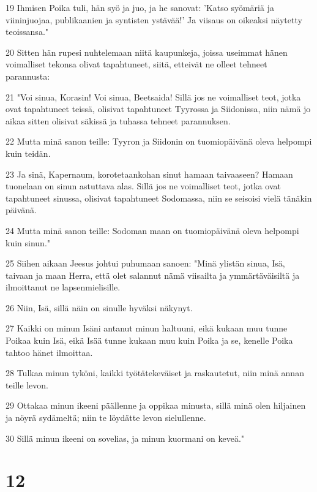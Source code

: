 \par 19 Ihmisen Poika tuli, hän syö ja juo, ja he sanovat: 'Katso syömäriä ja viininjuojaa, publikaanien ja syntisten ystävää!' Ja viisaus on oikeaksi näytetty teoissansa."
\par 20 Sitten hän rupesi nuhtelemaan niitä kaupunkeja, joissa useimmat hänen voimalliset tekonsa olivat tapahtuneet, siitä, etteivät ne olleet tehneet parannusta:
\par 21 "Voi sinua, Korasin! Voi sinua, Beetsaida! Sillä jos ne voimalliset teot, jotka ovat tapahtuneet teissä, olisivat tapahtuneet Tyyrossa ja Siidonissa, niin nämä jo aikaa sitten olisivat säkissä ja tuhassa tehneet parannuksen.
\par 22 Mutta minä sanon teille: Tyyron ja Siidonin on tuomiopäivänä oleva helpompi kuin teidän.
\par 23 Ja sinä, Kapernaum, korotetaankohan sinut hamaan taivaaseen? Hamaan tuonelaan on sinun astuttava alas. Sillä jos ne voimalliset teot, jotka ovat tapahtuneet sinussa, olisivat tapahtuneet Sodomassa, niin se seisoisi vielä tänäkin päivänä.
\par 24 Mutta minä sanon teille: Sodoman maan on tuomiopäivänä oleva helpompi kuin sinun."
\par 25 Siihen aikaan Jeesus johtui puhumaan sanoen: "Minä ylistän sinua, Isä, taivaan ja maan Herra, että olet salannut nämä viisailta ja ymmärtäväisiltä ja ilmoittanut ne lapsenmielisille.
\par 26 Niin, Isä, sillä näin on sinulle hyväksi näkynyt.
\par 27 Kaikki on minun Isäni antanut minun haltuuni, eikä kukaan muu tunne Poikaa kuin Isä, eikä Isää tunne kukaan muu kuin Poika ja se, kenelle Poika tahtoo hänet ilmoittaa.
\par 28 Tulkaa minun tyköni, kaikki työtätekeväiset ja raskautetut, niin minä annan teille levon.
\par 29 Ottakaa minun ikeeni päällenne ja oppikaa minusta, sillä minä olen hiljainen ja nöyrä sydämeltä; niin te löydätte levon sielullenne.
\par 30 Sillä minun ikeeni on sovelias, ja minun kuormani on keveä."

\chapter{12}

